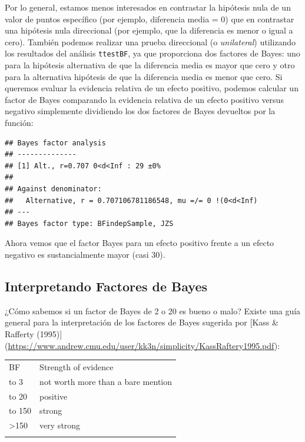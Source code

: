 \documentclass[
  12pt,
]{book}
\theoremstyle{definition}
\theoremstyle{definition}
\theoremstyle{definition}
\theoremstyle{remark}
\begin{document}
Por lo general, estamos menos interesados en contrastar la hipótesis nula de un valor de puntos específico (por ejemplo, diferencia media = 0) que en contrastar una hipótesis nula direccional (por ejemplo, que la diferencia es menor o igual a cero). También podemos realizar una prueba direccional (o \emph{unilateral}) utilizando los resultados del análisis \texttt{ttestBF}, ya que proporciona dos factores de Bayes: uno para la hipótesis alternativa de que la diferencia media es mayor que cero y otro para la alternativa hipótesis de que la diferencia media es menor que cero. Si queremos evaluar la evidencia relativa de un efecto positivo, podemos calcular un factor de Bayes comparando la evidencia relativa de un efecto positivo versus negativo simplemente dividiendo los dos factores de Bayes devueltos por la función:

\begin{verbatim}
## Bayes factor analysis
## --------------
## [1] Alt., r=0.707 0<d<Inf : 29 ±0%
## 
## Against denominator:
##   Alternative, r = 0.707106781186548, mu =/= 0 !(0<d<Inf) 
## ---
## Bayes factor type: BFindepSample, JZS
\end{verbatim}

Ahora vemos que el factor Bayes para un efecto positivo frente a un efecto negativo es sustancialmente mayor (casi 30).

\hypertarget{interpretando-factores-de-bayes}{%
\subsection{Interpretando Factores de Bayes}\label{interpretando-factores-de-bayes}}

¿Cómo sabemos si un factor de Bayes de 2 o 20 es bueno o malo? Existe una guía general para la interpretación de los factores de Bayes sugerida por {[}Kass \& Rafferty (1995){]} (\url{https://www.andrew.cmu.edu/user/kk3n/simplicity/KassRaftery1995.pdf}):

\begin{longtable}[]{@{}ll@{}}
\toprule
BF & Strength of evidence\textbar{} \\ \addlinespace
\midrule
\endhead
1 to 3 & not worth more than a bare mention \\ \addlinespace
3 to 20 & positive \\ \addlinespace
20 to 150 & strong \\ \addlinespace
\textgreater150 & very strong \\ \addlinespace
\bottomrule
\end{longtable}
\end{document}
